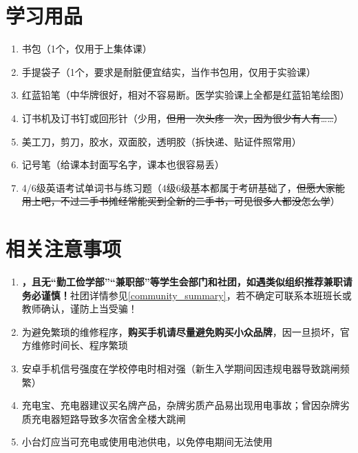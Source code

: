 \section[学习用品]{学习用品}
\begin{enumerate}
      \item 书包（1个，仅用于上集体课）
      \item 手提袋子（1个，要求是耐脏便宜结实，当作书包用，仅用于实验课\footnotemark）
      \item 红蓝铅笔（中华牌很好，相对不容易断。医学实验课上全都是红蓝铅笔绘图）
      \item 订书机及订书钉或回形针（少用，\sout{但用一次头疼一次，因为很少有人有……}）
      \item 美工刀，剪刀，胶水，双面胶，透明胶（拆快递、贴证件照常用）
      \item 记号笔（给课本封面写名字，课本也很容易丢）
      \item 4/6级英语考试单词书与练习题（4级6级基本都属于考研基础了，\sout{但愿大家能用上吧，不过\linebreak[3]二手书摊经常能买到全新的二手书，可见很多人都没怎么学}）
\end{enumerate}

\section[相关注意事项]{相关注意事项}
\begin{enumerate}
      \item \textbf{，且无“勤工俭学部”“兼职部”等学生会部\linebreak[3]门和社团，如遇类似组织推荐兼职请务必谨慎！}社团详情参见\uline{\ref{community_summary}}，若不确定可联系本班班长或教师确认，谨防上当受骗！
      \item 为避免繁琐的维修程序，\textbf{购买手机请尽量避免购买小众品牌}，因一旦损坏，官方维修时间长、程序繁琐
      \item 安卓手机信号强度在学校停电时相对强（新生入学期间因违规电器导致跳闸频繁）
      \item 充电宝、充电器建议买名牌产品，杂牌劣质产品易出现用电事故；曾因杂牌劣质充电器短路导致多次宿舍全楼大跳闸
      \item 小台灯应当可充电或使用电池供电，以免停电期间无法使用
\end{enumerate}